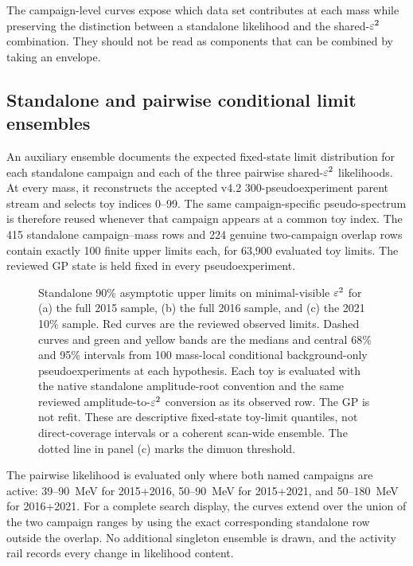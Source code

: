 The campaign-level curves expose which data set contributes at each mass while
preserving the distinction between a standalone likelihood and the shared-$\varepsilon^2$
combination. They should not be read as components that can be combined by taking
an envelope.

\subsection{Standalone and pairwise conditional limit ensembles}
\label{sec:results-v4p2-standalone-pairwise-bands}

An auxiliary ensemble documents the expected fixed-state limit distribution for
each standalone campaign and each of the three pairwise shared-$\varepsilon^2$
likelihoods. At every mass, it reconstructs the accepted v4.2
300-pseudoexperiment parent stream and selects toy indices 0--99. The same
campaign-specific pseudo-spectrum is therefore reused whenever that campaign
appears at a common toy index. The 415 standalone campaign--mass rows and 224
genuine two-campaign overlap rows contain exactly 100 finite upper limits each,
for 63,900 evaluated toy limits. The reviewed GP state is held fixed in every
pseudoexperiment.

\begin{figure}[H]
\centering
{}
\caption{Standalone 90\% asymptotic \CLs{} upper limits on minimal-visible
$\varepsilon^2$ for (a) the full 2015 sample, (b) the full 2016 sample, and (c) the
2021 10\% sample. Red curves are the reviewed observed limits. Dashed curves
and green and yellow bands are the medians and central 68\% and 95\% intervals
from 100 mass-local conditional background-only pseudoexperiments at each
hypothesis. Each toy is evaluated with the native standalone amplitude-root
convention and the same reviewed amplitude-to-$\varepsilon^2$ conversion as its
observed row. The GP is not refit. These are descriptive fixed-state
toy-limit quantiles, not direct-coverage intervals or a coherent scan-wide
ensemble. The dotted line in panel (c) marks the dimuon threshold.}
\label{fig:results-v4p2-standalone-bands}
\end{figure}

The pairwise likelihood is evaluated only where both named campaigns are
active: 39--90~MeV for 2015+2016, 50--90~MeV for 2015+2021, and
50--180~MeV for 2016+2021. For a complete search display, the curves extend
over the union of the two campaign ranges by using the exact corresponding
standalone row outside the overlap. No additional singleton ensemble is drawn,
and the activity rail records every change in likelihood content.

